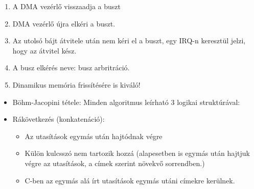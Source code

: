 \documentclass[11pt,a4paper]{article}
\begin{document}
\begin{tcolorbox}[colback=blue!5!white,colframe=blue!50!black,title= 15. Ismertesse a periféria csatolási módszereket{,} módszerenként kitérve az adott módszer előnyére{,} és hátrányára! Part 2.]
\begin{itemize}
\begin{enumerate}
                        \item A DMA vezérlő visszaadja a buszt
                        \item DMA vezérlő újra elkéri a buszt.
                        \item Az utolsó bájt átvitele után nem kéri el a buszt, egy IRQ-n keresztül jelzi, hogy az átvitel kész.
                        \item A busz elkérés neve: busz arbritráció.
                        \item Dinamikus memória frissítésére is kiváló!
                    \end{enumerate}
                \end{itemize}
            \end{tcolorbox}
            
            \begin{tcolorbox}[colback=blue!5!white,colframe=blue!50!black,title= 16. Ismertesse az alapvető algoritmus-elemeket a Böhm-Jacopini tétel alapján!]
                \begin{itemize}
                    \item Böhm-Jacopini tétele: Minden algoritmus leírható 3 logikai struktúrával:
                    \item Rákövetkezés (konkatenáció):
                    \begin{itemize}
                        \item Az utasítások egymás után hajtódnak végre
                        \item Külön kulcsszó nem tartozik hozzá (alapesetben is egymás után hajtjuk végre az utasítások, a címek szerint növekvő sorrendben.) 
                        \item C-ben az egymás alá írt utasítások egymás utáni címekre kerülnek.
                        \begin{center}

\end{center}
\end{itemize}
\end{itemize}
\end{tcolorbox}
\end{document}
